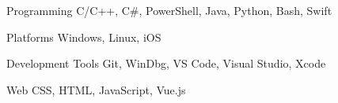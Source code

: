 
\begin{cvskills}

  \cvskill
    {Programming} %
    {C/C++, C\#, PowerShell, Java, Python, Bash, Swift} %

  \cvskill
    {Platforms} %
    {Windows, Linux, iOS} %

  \cvskill
    {Development Tools} %
    {Git, WinDbg, VS Code, Visual Studio, Xcode} %

  \cvskill
    {Web} %
    {CSS, HTML, JavaScript, Vue.js} %

\end{cvskills}

